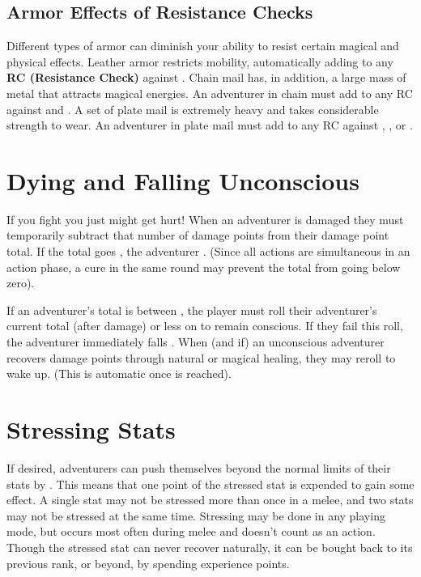\begin{multicols}{2}
\subsection{Armor Effects of Resistance Checks}
Different types of armor can diminish your ability to resist certain magical and physical effects. Leather armor restricts mobility, automatically adding  to any \textbf{RC (Resistance Check)} against \AGI. Chain mail has, in addition, a large mass of metal that attracts magical energies. An adventurer in chain must add  to any RC against \AGI and \PWR. A set of plate mail is extremely heavy and takes considerable strength to wear. An adventurer in plate mail must add  to any RC against \AGI, \PWR, or \STR.
\section{Dying and Falling Unconscious}
If you fight you just might get hurt! When an adventurer is damaged they must temporarily subtract that number of damage points from their damage point total. If the total goes , the adventurer  . (Since all actions are simultaneous in an action phase, a cure in the same round may prevent the total from going below zero).

If an adventurer's \DP total is between , the player must roll their adventurer's current \DP total (after damage) or less on  to remain conscious. If they fail this roll, the adventurer immediately falls . When (and if) an unconscious adventurer recovers damage points through natural or magical healing, they may reroll to wake up. (This is automatic once  is reached).
\section{Stressing Stats}
If desired, adventurers can push themselves beyond the normal limits of their stats by . This means that one point of the stressed stat is expended  to gain some effect. A single stat may not be stressed more than once in a melee, and two stats may not be stressed at the same time. Stressing may be done in any playing mode, but occurs most often during melee and doesn't count as an action. Though the stressed stat can never recover naturally, it can be bought back to its previous rank, or beyond, by spending experience points.


\end{multicols}

